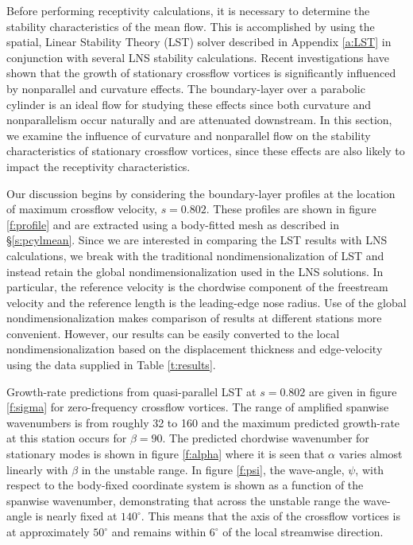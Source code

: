 Before performing receptivity calculations, it is necessary to determine the
stability characteristics of the mean flow.  This is accomplished by using the
spatial, Linear Stability Theory (LST) solver described in Appendix
\ref{a:LST} in conjunction with several LNS stability calculations.  Recent
investigations \cite{MaMa:94,MaBa:93} have shown that the growth of stationary
crossflow vortices is significantly influenced by nonparallel and curvature
effects. The boundary-layer over a parabolic cylinder is an ideal flow for
studying these effects since both curvature and nonparallelism occur naturally
and are attenuated downstream.  In this section, we examine the influence of
curvature and nonparallel flow on the stability characteristics of stationary
crossflow vortices, since these effects are also likely to impact the
receptivity characteristics.

Our discussion begins by considering the boundary-layer profiles at the
location of maximum crossflow velocity, $s=0.802$.  These profiles are shown
in figure \ref{f:profile} and are extracted using a body-fitted mesh as
described in \S\ref{s:pcylmean}.  Since we are interested in comparing the LST
results with LNS calculations, we break with the traditional
nondimensionalization of LST and instead retain the global
nondimensionalization used in the LNS solutions. In particular, the reference
velocity is the chordwise component of the freestream velocity and the
reference length is the leading-edge nose radius. Use of the global
nondimensionalization makes comparison of results at different stations more
convenient.  However, our results can be easily converted to the local
nondimensionalization based on the displacement thickness and edge-velocity
using the data supplied in Table \ref{t:results}.

Growth-rate predictions from quasi-parallel LST at $s=0.802$ are given in
figure \ref{f:sigma} for zero-frequency crossflow vortices.  The range of
amplified spanwise wavenumbers is from roughly 32 to 160 and the maximum
predicted growth-rate at this station occurs for $\beta = 90$.  The predicted
chordwise wavenumber for stationary modes is shown in figure \ref{f:alpha}
where it is seen that $\alpha$ varies almost linearly with $\beta$ in the
unstable range. In figure \ref{f:psi}, the wave-angle, $\psi$, with respect to
the body-fixed coordinate system is shown as a function of the spanwise
wavenumber, demonstrating that across the unstable range the wave-angle is
nearly fixed at $140^\circ$.  This means that the axis of the crossflow
vortices is at approximately $50^\circ$ and remains within $6^\circ$ of the
local streamwise direction.

